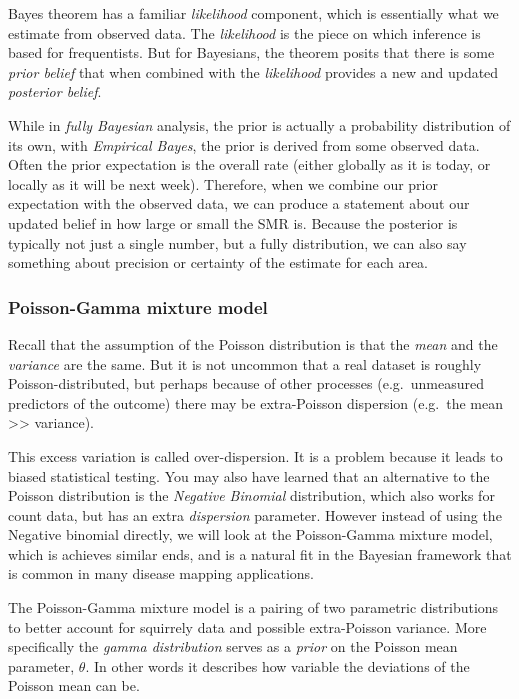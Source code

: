 \documentclass[
]{book}
\begin{document}
Bayes theorem has a familiar \emph{likelihood} component, which is essentially what we estimate from observed data. The \emph{likelihood} is the piece on which inference is based for frequentists. But for Bayesians, the theorem posits that there is some \emph{prior belief} that when combined with the \emph{likelihood} provides a new and updated \emph{posterior belief}.

While in \emph{fully Bayesian} analysis, the prior is actually a probability distribution of its own, with \emph{Empirical Bayes}, the prior is derived from some observed data. Often the prior expectation is the overall rate (either globally as it is today, or locally as it will be next week). Therefore, when we combine our prior expectation with the observed data, we can produce a statement about our updated belief in how large or small the SMR is. Because the posterior is typically not just a single number, but a fully distribution, we can also say something about precision or certainty of the estimate for each area.

\hypertarget{poisson-gamma-mixture-model}{%
\subsubsection{Poisson-Gamma mixture model}\label{poisson-gamma-mixture-model}}

Recall that the assumption of the Poisson distribution is that the \emph{mean} and the \emph{variance} are the same. But it is not uncommon that a real dataset is roughly Poisson-distributed, but perhaps because of other processes (e.g.~unmeasured predictors of the outcome) there may be extra-Poisson dispersion (e.g.~the mean \textgreater\textgreater{} variance).

This excess variation is called over-dispersion. It is a problem because it leads to biased statistical testing. You may also have learned that an alternative to the Poisson distribution is the \emph{Negative Binomial} distribution, which also works for count data, but has an extra \emph{dispersion} parameter. However instead of using the Negative binomial directly, we will look at the Poisson-Gamma mixture model, which is achieves similar ends, and is a natural fit in the Bayesian framework that is common in many disease mapping applications.

The Poisson-Gamma mixture model is a pairing of two parametric distributions to better account for squirrely data and possible extra-Poisson variance. More specifically the \emph{gamma distribution} serves as a \emph{prior} on the Poisson mean parameter, \(\theta\). In other words it describes how variable the deviations of the Poisson mean can be.
\end{document}
